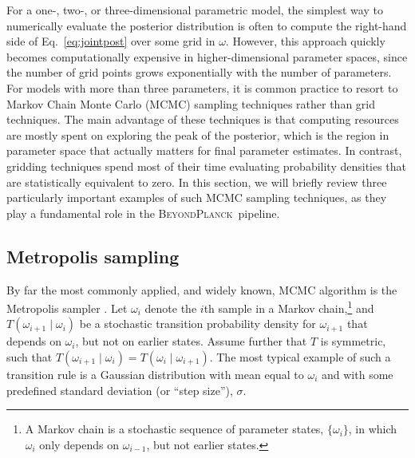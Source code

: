 \documentclass[twocolumn]{aa}
\newcommand{\BP}{\textsc{BeyondPlanck}}
\begin{document}
For a one-, two-, or three-dimensional parametric model, the simplest
way to numerically evaluate the posterior distribution is often to
compute the right-hand side of Eq.~\eqref{eq:jointpost} over some grid
in $\omega$. However, this approach quickly becomes computationally
expensive in higher-dimensional parameter spaces, since the number of
grid points grows exponentially with the number of parameters. For
models with more than three parameters, it is common practice to
resort to Markov Chain Monte Carlo (MCMC) sampling techniques rather
than grid techniques. The main advantage of these techniques is that
computing resources are mostly spent on exploring the peak of the
posterior, which is the region in parameter space that actually
matters for final parameter estimates. In contrast, gridding
techniques spend most of their time evaluating probability densities
that are statistically equivalent to zero. In this section, we will
briefly review three particularly important examples of such MCMC
sampling techniques, as they play a fundamental role in the
\BP\ pipeline.

\subsection{Metropolis sampling}
\label{sec:metropolis}

By far the most commonly applied, and widely known, MCMC algorithm is
the Metropolis sampler \citep{metropolis:1953}. Let $\omega_i$ denote
the $i$th sample in a Markov chain,\footnote{A Markov chain is a
  stochastic sequence of parameter states, $\{\omega_i\}$, in which
  $\omega_i$ only depends on $\omega_{i-1}$, but not earlier states.}
and $T(\omega_{i+1}\mid \omega_i)$ be a stochastic transition probability
density for $\omega_{i+1}$ that depends on $\omega_i$, but not on
earlier states. Assume further that $T$ is symmetric, such that
$T(\omega_{i+1}\mid \omega_i) = T(\omega_i\mid \omega_{i+1})$. The most
typical example of such a transition rule is a Gaussian distribution
with mean equal to $\omega_i$ and with some predefined standard
deviation (or ``step size''), $\sigma$.
\end{document}
